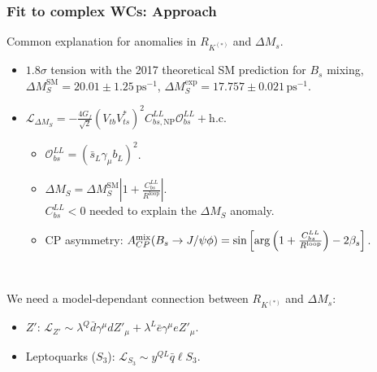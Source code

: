 \documentclass[mathserif, 10pt]{beamer}
\newcommand{\ACPmix}{\ensuremath{A_{CP}^{\rm{mix}}}}
\begin{document}
\begin{frame}\frametitle{Fit to complex WCs: Approach}
    Common explanation for anomalies in $R_{K^{(*)}}$ and $\Delta M_s$.
    \begin{itemize}
        \item $1.8\sigma$ tension with the 2017 theoretical SM prediction for $B_s$ mixing,\\
$\Delta M_S^\mathrm{SM} = 20.01 \pm 1.25\,\mathrm{ps}^{-1}$, \qquad$\Delta M_S^\mathrm{exp} = 17.757 \pm 0.021 \,\mathrm{ps}^{-1}$. \footnotemark[7]
        \item $\mathcal{L}_{\Delta M_S} = -\frac{4 G_f}{\sqrt{2}} (V_{tb} V_{ts}^*)^2 C_{bs, \mathrm{NP}}^{LL} \mathcal{O}_{bs}^{LL} + \mathrm{h. c.}$
              \begin{itemize}
\item $ \mathcal{O}_{bs}^{LL} = (\bar{s}_L \gamma_\mu b_L)^2$.
\item $\Delta M_S = \Delta M_S^\mathrm{SM} \left|1 + \frac{C_{bs}^{LL} }{R^\mathrm{loop}} \right|$.\\ $C_{bs}^{LL}< 0$ needed to explain the $\Delta M_S$ anomaly.
\item CP asymmetry\footnotemark[7]: $\ACPmix (B_s\to J/\psi \phi)= \sin \left[\mathrm{arg}\left(   1 + \frac{C_{bs}^{LL} }{R^\mathrm{loop}} \right) - 2 \beta_s \right] $.
              \end{itemize}
    \end{itemize}

    ~

    We need a model-dependant connection between $R_{K^{(*)}}$ and $\Delta M_s$:
    \begin{itemize}
        \item $Z'$: $\mathcal{L}_{Z'} \sim \lambda^Q \bar{d}\gamma^\mu d Z'_\mu + \lambda^L \bar{e}\gamma^\mu e Z'_{\mu}$.
        \item Leptoquarks ($S_3$): $\mathcal{L}_{S_3} \sim y^{QL} \bar{q} \ell S_3$.
    \end{itemize}
\end{frame}
\end{document}
